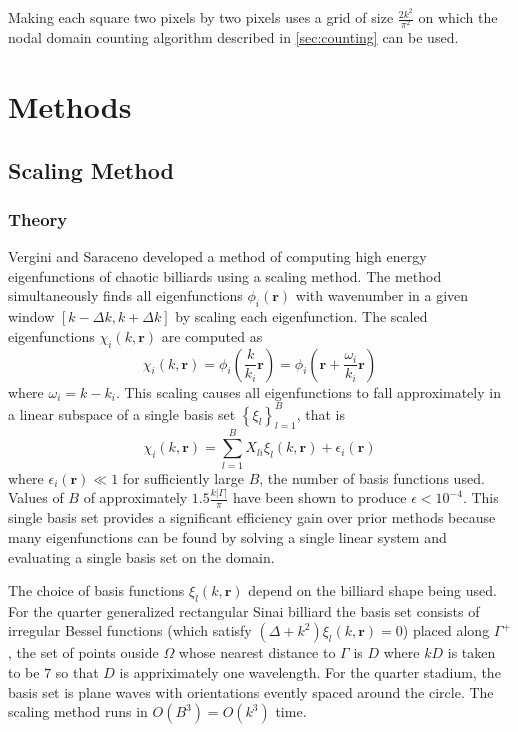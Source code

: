 \documentclass{report}
\newcommand{\rr}[0]{\mathbf{r}}
\begin{document}
Making each square two pixels by two pixels uses a grid of size $\frac{2 k^{2}}{\pi^2}$ on which the nodal domain counting algorithm described in \ref{sec:counting} can be used.

\chapter{Methods}
\section{Scaling Method}
\label{sec:scaling_method}
\subsection{Theory}
Vergini and Saraceno \cite{vergini} developed a method of computing high energy eigenfunctions of chaotic billiards using a scaling method. The method simultaneously finds all eigenfunctions $\phi_{i}(\rr)$ with wavenumber in a given window $[k - \Delta k, k + \Delta k]$ by scaling each eigenfunction. The scaled eigenfunctions $\chi_{i}(k, \rr)$ are computed as
\[
\chi_{i}(k, \rr) = \phi_{i} \left( \frac{k}{k_{i}} \rr \right) = \phi_{i} \left( \rr + \frac{\omega_{i}}{k_i} \rr \right)
\]
where $\omega_{i} = k - k_i$. This scaling causes all eigenfunctions to fall approximately in a linear subspace of a single basis set $\left\{ \xi_{l} \right\}_{l=1}^{B}$, that is
\[
\chi_{i}(k, \rr) = \sum_{l=1}^{B} X_{li} \xi_{l}(k, \rr) + \epsilon_{i}(\rr)
\]
where $\epsilon_{i}(\rr) \ll 1$ for sufficiently large $B$, the number of basis functions used. Values of $B$ of approximately $1.5 \frac{k \vert \Gamma \vert}{\pi}$ have been shown to produce $\epsilon < 10^{-4}$. This single basis set provides a significant efficiency gain over prior methods because many eigenfunctions can be found by solving a single linear system and evaluating a single basis set on the domain.

The choice of basis functions $\xi_{l}(k, \rr)$ depend on the billiard shape being used. For the quarter generalized rectangular Sinai billiard the basis set consists of irregular Bessel functions (which satisfy $(\Delta + k^2)\xi_{l}(k, \rr) = 0$) placed along $\Gamma^{+}$, the set of points ouside $\Omega$ whose nearest distance to $\Gamma$ is $D$ where $kD$ is taken to be $7$ so that $D$ is appriximately one wavelength. For the quarter stadium, the basis set is plane waves with orientations evently spaced around the circle. The scaling method runs in $O(B^{3}) = O(k^{3})$ time. \cite{barnett}
\end{document}
